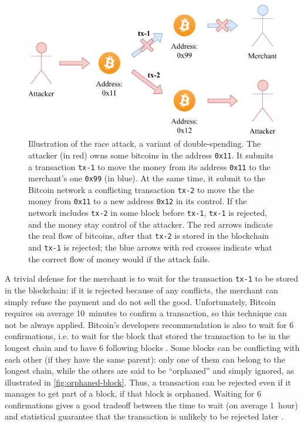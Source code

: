 \begin{figure}[t]
	\centering
	\vspace*{0.25cm}
	\includegraphics[scale=0.75]{figures/race_attack}
	\vspace*{0.25cm}
	\caption[Illustration of the race attack, a variant of double-spending]{
		Illustration of the race attack, a variant of double-spending.
		The attacker (in red) owns some bitcoins in the address \texttt{0x11}.
		It submits a transaction \texttt{tx-1} to move the money from its address \texttt{0x11} to the merchant's one \texttt{0x99} (in blue).
		At the same time, it submit to the Bitcoin network a conflicting transaction \texttt{tx-2} to move the the money from \texttt{0x11} to a new address \texttt{0x12} in its control.
		If the network includes \texttt{tx-2} in some block before \texttt{tx-1}, \texttt{tx-1} is rejected, and the money stay control of the attacker.
		The red arrows indicate the real flow of bitcoins, after that \texttt{tx-2} is stored in the blockchain and \texttt{tx-1} is rejected;
		the blue arrows with red crosses indicate what the correct flow of money would if the attack fails.
	}
	\label{fig:race-attack}
\end{figure}

A trivial defense for the merchant is to wait for the transaction \texttt{tx-1} to be stored in the blockchain:
if it is rejected because of any conflicts, the merchant can simply refuse the payment and do not sell the good.
Unfortunately, Bitcoin requires on average \SI{10}{minutes} to confirm a transaction, so this technique can not be always applied.
Bitcoin's developers recommendation is also to wait for \num{6} confirmations, i.e. to wait for the block that stored the transaction to be in the longest chain and to have \num{6} following blocks \cite{confirmation}.
Some blocks can be conflicting with each other (if they have the same parent):
only one of them can belong to the longest chain, while the others are said to be ``orphaned'' \cite{orphaned_block} and simply ignored, as illustrated in \cref{fig:orphaned-block}.
Thus, a transaction can be rejected even if it manages to get part of a block, if that block is orphaned.
Waiting for \num{6} confirmations gives a good tradeoff between the time to wait (on average \SI{1}{hour}) and statistical guarantee that the transaction is unlikely to be rejected later \cite{bitcoin_2009}.

